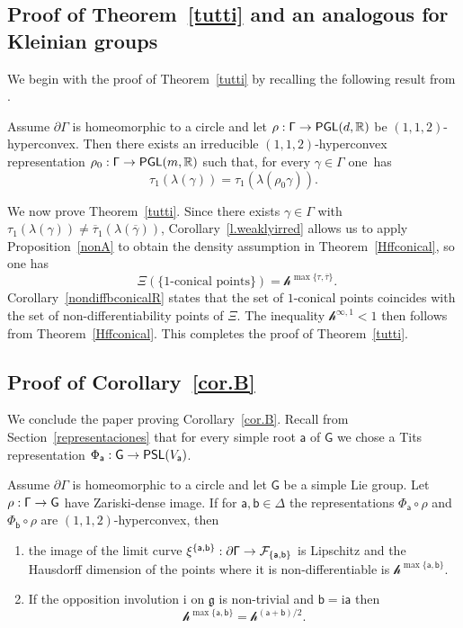 \documentclass[AHL,Unicode,longabstracts,MathTools]{cedram}
\DeclareMathOperator{\Hff}{dim_{Hf{}f}}
\newcommand{\ii}{\mathrm{i}}
\DeclareMathOperator{\PSL}{{\mathsf{PSL}}}
\DeclareMathOperator{\PGL}{{\mathsf{PGL}}}
\newcommand{\scr}{\mathscr}
\newcommand{\hC}[1]{{\scr h}^{#1}}
\renewcommand{\sf}[1]{{\mathsf{#1}}}
\newcommand{\sroot}{{\sf{a}}}
\newcommand{\bb}{{\sf{b}}}
\newcommand{\sfG}{\sf{G}}
\newcommand{\G}{\sf{\Gamma}}
\newcommand{\calF}{\mathcal{F}}
\newcommand{\R}{\mathbb{R}}
\newcommand{\g}{\gamma}
\newcommand{\bord}{\partial}
\newcommand{\simple}{{\sf \Delta}}
\newcommand{\slroot}{{\tau}}
\newcommand{\ov}{\overline}
\renewcommand{\/}{\backslash}
\newcommand{\<}{\langle}
\renewcommand{\>}{\rangle}
\renewcommand{\ge}{\mathfrak{g}}
\renewcommand*{\to}{\mathchoice{\longrightarrow}{\rightarrow}{\rightarrow}{\rightarrow}}
\newcommand*{\relabel}{\renewcommand{\labelenumi}{(\theenumi)}}
\newcommand*{\romanenumi}{\renewcommand*{\theenumi}{\roman{enumi}}\relabel}
\begin{document}
\subsection{Proof of Theorem~\ref{tutti} and an analogous for Kleinian groups}

We begin with the proof of Theorem~\ref{tutti} by recalling the following result from \cite{BeyP2}.

\begin{coro}\label{l.weaklyirred}
Assume $\bord\G$ is homeomorphic to a circle and let $\rho:\G\to \PGL(d,\R)$ be $(1,1,2)$-hyperconvex. Then there exists an irreducible $(1,1,2)$-hyperconvex representation $\rho_0:\G\to \PGL(m,\R)$ such that, for every $\g\in\G$ one~has
\[
\slroot_1(\lambda(\g))=\slroot_1(\lambda(\rho_0\g)).
\]
\end{coro}


We now prove Theorem~\ref{tutti}. Since there exists $\g\in\G$ with $\slroot_1(\lambda(\g))\neq\ov{\slroot}_1(\lambda(\ov\g))$, Corollary~\ref{l.weaklyirred} allows us to apply Proposition~\ref{nonA} to obtain the density assumption in Theorem~\ref{Hffconical}, so one has
\[
\Hff\Xi(\{1\text{-conical points}\})=\hC{\max\{\slroot,\ov{\slroot}\}}.
\]
Corollary~\ref{nondiffbconicalR} states that the set of $1$-conical points coincides with the set of non-differentiability points of $\Xi$. The inequality $\hC{\infty,1} <1$ then follows from Theorem~\ref{Hffconical}. This completes the proof of Theorem~\ref{tutti}.



\subsection{Proof of Corollary~\ref{cor.B}} We conclude the paper proving Corollary~\ref{cor.B}. Recall from Section~\ref{representaciones} that for every simple root $\sroot$ of $\sfG$ we chose a Tits representation $\Phi_\sroot:\sfG\to\PSL(V_\sroot)$.

\begin{coro}\label{c.Hk}
Assume $\bord\G$ is homeomorphic to a circle and let $\sfG$ be a simple Lie group. Let $\rho:\G\to\sfG$ have Zariski-dense image. If for $\sroot,\bb\in\simple$ the representations $\Phi_\sroot\circ\rho$ and $\Phi_\bb\circ \rho$ are $(1,1,2)$-hyperconvex,
then
\begin{enumerate}\romanenumi
\item\label{coro8.3.1} the image of the limit curve $\xi^{\{\sroot,\bb\}}:\bord\G\to\calF_{\{\sroot,\bb\}}$ is Lipschitz and the Hausdorff dimension of the points where it is non-differentiable is $\hC{\max\{\sroot,\bb\}}$.
\item\label{coro8.3.2} If the opposition involution $\ii$ on $\ge$ is non-trivial and $\bb=\ii\sroot$ then
\[
\hC{\max\{\sroot,\bb\}}=\hC{(\sroot+\bb)/2}.
\]
\end{enumerate}
\end{coro}
\end{document}
